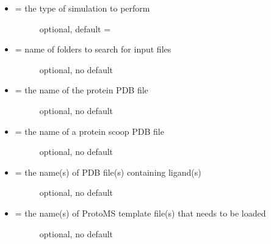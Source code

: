 \documentclass[letterpaper,10pt,english]{sphinxmanual}
\begin{document}
\begin{itemize}
\item {} \begin{description}
\item[{ = the type of simulation to perform}] \leavevmode
optional, default = 

\end{description}

\item {} \begin{description}
\item[{ = name of folders to search for input files}] \leavevmode
optional, no default

\end{description}

\item {} \begin{description}
\item[{ = the name of the protein PDB file}] \leavevmode
optional, no default

\end{description}

\item {} \begin{description}
\item[{ = the name of a protein scoop PDB file}] \leavevmode
optional, no default

\end{description}

\item {} \begin{description}
\item[{ = the name(s) of PDB file(s) containing ligand(s)}] \leavevmode
optional, no default

\end{description}

\item {} \begin{description}
\item[{ = the name(s) of ProtoMS template file(s) that needs to be loaded}] \leavevmode
optional, no default

\end{description}


\end{itemize}
\end{document}
